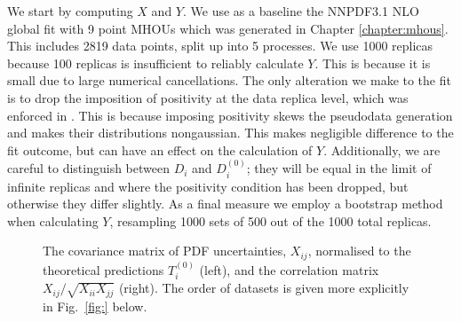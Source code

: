 We start by computing $X$ and $Y$. We use as a baseline the NNPDF3.1 NLO global fit with 9 point MHOUs which was generated in Chapter \ref{chapter:mhous}. This includes 2819 data points, split up into 5 processes. We use 1000 replicas because 100 replicas is insufficient to reliably calculate $Y$. This is because it is small due to large numerical cancellations. The only alteration we make to the fit is to drop the imposition of positivity at the data replica level, which was enforced in \cite{Ball:2017nwa}. This is because imposing positivity skews the pseudodata generation and makes their distributions nongaussian. This makes negligible difference to the fit outcome, but can have an effect on the calculation of $Y$. Additionally, we are careful to distinguish between $D_i$ and $D_i^{(0)}$; they will be equal in the limit of infinite replicas and where the positivity condition has been dropped, but otherwise they differ slightly. As a final measure we employ a bootstrap method when calculating $Y$, resampling 1000 sets of 500 out of the 1000 total replicas.
\begin{figure}[h]
    \begin{center}
    \end{center}
  \vspace{-0.55cm}
  \caption{The covariance matrix of PDF uncertainties, $X_{ij}$, normalised to the theoretical predictions $T^{(0)}_i$  (left), and the correlation matrix $X_{ij}/\sqrt{X_{ii}X_{jj}}$ (right). The order of datasets is given more explicitly in Fig.~\ref{fig:} below.}
  \label{fig:X}
\end{figure}

